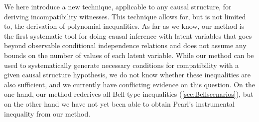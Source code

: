 

We here introduce a new technique, applicable to any causal structure, for deriving incompatibility witnesses. This technique allows for, but is not limited to, the derivation of polynomial inequalities. As far as we know, our method is the first systematic tool for doing causal inference with latent variables that goes beyond observable conditional independence relations and does not assume any bounds on the number of values of each latent variable. While our method can be used to systematically generate necessary conditions for compatibility with a given causal structure hypothesis, we do not know whether these inequalities are also sufficient, and we currently have conflicting evidence on this question. On the one hand, our method rederives all Bell-type inequalities (\cref{sec:Bellscenarios}), but on the other hand we have not yet been able to obtain Pearl's instrumental inequality from our method.

